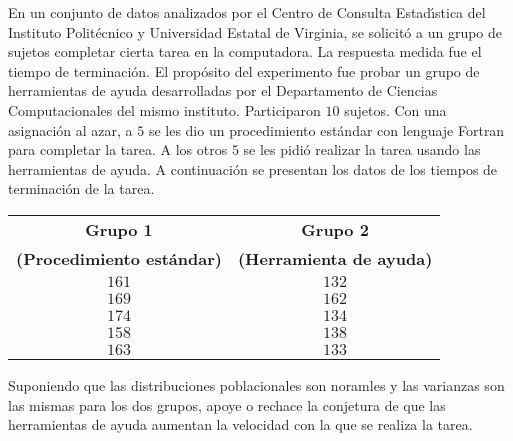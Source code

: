 \begin{enunciado}
 En un conjunto de datos analizados por el Centro de Consulta
 Estad\'{\i}stica del Instituto Polit\'ecnico y Universidad Estatal
 de Virginia, se solicit\'o a un grupo de sujetos completar cierta tarea
 en la computadora.
 La respuesta medida fue el tiempo de terminaci\'on.
 El prop\'osito del experimento fue probar un grupo de herramientas
 de ayuda desarrolladas por el Departamento de Ciencias Computacionales
 del mismo instituto.
 Participaron $10$ sujetos.
 Con una asignaci\'on al azar, a $5$ se les dio un procedimiento est\'andar
 con lenguaje Fortran para completar la tarea.
 A los otros $5$ se les pidi\'o realizar la tarea usando las herramientas
 de ayuda.
 A continuaci\'on se presentan los datos de los tiempos de terminaci\'on de la tarea.
 \begin{center}
  \begin{tabular}{cc}
   \textbf{Grupo 1} & \textbf{Grupo 2} \\
   \textbf{(Procedimiento est\'andar)} & \textbf{(Herramienta de ayuda)} \\
   \hline 
   $161$ & $132$ \\
   $169$ & $162$ \\
   $174$ & $134$ \\
   $158$ & $138$ \\
   $163$ & $133$
  \end{tabular}
 \end{center}
 Suponiendo que las distribuciones poblacionales son noramles y las varianzas son las mismas para los dos grupos, apoye o rechace la conjetura de que las herramientas de ayuda aumentan la velocidad con la que se realiza la tarea.
\end{enunciado}

